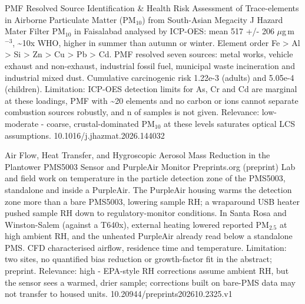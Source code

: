 \documentclass[10pt]{article}
\begin{document}
{PMF Resolved Source Identification \& Health Risk Assessment of Trace-elements in Airborne Particulate Matter (PM$_{10}$) from South-Asian Megacity}
{J Hazard Mater}
{Filter PM$_{10}$ in Faisalabad analysed by ICP-OES: mean 517 +/- 206 $\mu$g\,m$^{-3}$, \textasciitilde{}10x WHO, higher in summer than autumn or winter. Element order Fe > Al > Si > Zn > Cu > Pb > Cd. PMF resolved seven sources: metal works, vehicle exhaust and non-exhaust, industrial fossil fuel, municipal waste incineration and industrial mixed dust. Cumulative carcinogenic risk 1.22e-3 (adults) and 5.05e-4 (children). Limitation: ICP-OES detection limits for As, Cr and Cd are marginal at these loadings, PMF with \textasciitilde{}20 elements and no carbon or ions cannot separate combustion sources robustly, and n of samples is not given. Relevance: low-moderate - coarse, crustal-dominated PM$_{10}$ at these levels saturates optical LCS assumptions.}
{10.1016/j.jhazmat.2026.144032}

\par{}\baselineskip{}\baselineskip
{}

{Air Flow, Heat Transfer, and Hygroscopic Aerosol Mass Reduction in the Plantower PMS5003 Sensor and PurpleAir Monitor}
{Preprints.org (preprint)}
{Lab and field work on temperature in the particle detection zone of the PMS5003, standalone and inside a PurpleAir. The PurpleAir housing warms the detection zone more than a bare PMS5003, lowering sample RH; a wraparound USB heater pushed sample RH down to regulatory-monitor conditions. In Santa Rosa and Winston-Salem (against a T640x), external heating lowered reported PM$_{2.5}$ at high ambient RH, and the unheated PurpleAir already read below a standalone PMS. CFD characterised airflow, residence time and temperature. Limitation: two sites, no quantified bias reduction or growth-factor fit in the abstract; preprint. Relevance: high - EPA-style RH corrections assume ambient RH, but the sensor sees a warmed, drier sample; corrections built on bare-PMS data may not transfer to housed units.}
{10.20944/preprints202610.2325.v1}
\end{document}
